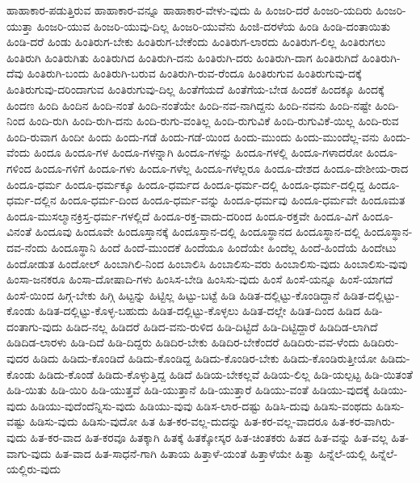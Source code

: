 {ಹಾಹಾಕಾರ-ಪಡುತ್ತಿರುವ
ಹಾಹಾಕಾರ-ವನ್ನೂ
ಹಾಹಾಕಾರ-ವೇಳು-ವುದು
ಹಿ
ಹಿಂಜರಿ-ದರೆ
ಹಿಂಜರಿ-ಯದಿರು
ಹಿಂಜರಿ-ಯುತ್ತಾ
ಹಿಂಜರಿ-ಯುವ
ಹಿಂಜರಿ-ಯುವು-ದಿಲ್ಲ
ಹಿಂಜರಿ-ಯುವೆನು
ಹಿಂಜಿ-ದರಳೆಯ
ಹಿಂಡಿ
ಹಿಂಡಿ-ದಂತಾಯಿತು
ಹಿಂಡಿ-ದರೆ
ಹಿಂಡು
ಹಿಂತಿರುಗ-ಬೇಕು
ಹಿಂತಿರುಗ-ಬೇಕೆಂದು
ಹಿಂತಿರುಗ-ಲಾರದು
ಹಿಂತಿರುಗ-ಲಿಲ್ಲ
ಹಿಂತಿರುಗಲು
ಹಿಂತಿರುಗಿ
ಹಿಂತಿರುಗಿತು
ಹಿಂತಿರುಗಿದ
ಹಿಂತಿರುಗಿ-ದನು
ಹಿಂತಿರುಗಿ-ದರು
ಹಿಂತಿರುಗಿ-ದಾಗ
ಹಿಂತಿರುಗಿದೆ
ಹಿಂತಿರುಗಿ-ದೆವು
ಹಿಂತಿರುಗಿ-ಬಂದು
ಹಿಂತಿರುಗಿ-ಬರುವ
ಹಿಂತಿರುಗಿ-ರುವ-ರೆಂದೂ
ಹಿಂತಿರುಗುವ
ಹಿಂತಿರುಗುವು-ದಕ್ಕೆ
ಹಿಂತಿರುಗುವು-ದರಿಂದಾಗುವ
ಹಿಂತಿರುಗುವು-ದಿಲ್ಲ
ಹಿಂತೆಗೆಯದೆ
ಹಿಂತೆಗೆಯ-ಬೇಡ
ಹಿಂದಕೆ
ಹಿಂದಕ್ಕೂ
ಹಿಂದಕ್ಕೆ
ಹಿಂದಣ
ಹಿಂದಿ
ಹಿಂದಿನ
ಹಿಂದಿ-ನಂತೆ
ಹಿಂದಿ-ನಂತೆಯೇ
ಹಿಂದಿ-ನವ-ನಾಗಿದ್ದನು
ಹಿಂದಿ-ನವನು
ಹಿಂದಿ-ನಷ್ಟೇ
ಹಿಂದಿ-ನಿಂದ
ಹಿಂದಿ-ರುಗಿ
ಹಿಂದಿ-ರುಗಿ-ದನು
ಹಿಂದಿ-ರುಗು-ವಂತಿಲ್ಲ
ಹಿಂದಿ-ರುಗುವಿಕೆ
ಹಿಂದಿ-ರುಗುವಿಕೆ-ಯಿಲ್ಲ
ಹಿಂದಿ-ರುವ
ಹಿಂದಿ-ರುವಾಗ
ಹಿಂದೀ
ಹಿಂದು
ಹಿಂದು-ಗಡೆ
ಹಿಂದು-ಗಡೆ-ಯಿಂದ
ಹಿಂದು-ಮುಂದು
ಹಿಂದು-ಮುಂದೆಲ್ಲ-ವನು
ಹಿಂದು-ವೆಂದು
ಹಿಂದೂ
ಹಿಂದೂ-ಗಳ
ಹಿಂದೂ-ಗಳನ್ನಾಗಿ
ಹಿಂದೂ-ಗಳನ್ನು
ಹಿಂದೂ-ಗಳಲ್ಲಿ
ಹಿಂದೂ-ಗಳಾದರೋ
ಹಿಂದೂ-ಗಳಿಂದ
ಹಿಂದೂ-ಗಳಿಗೆ
ಹಿಂದೂ-ಗಳು
ಹಿಂದೂ-ಗಳೆಲ್ಲ
ಹಿಂದೂ-ಗಳೆಲ್ಲರೂ
ಹಿಂದೂ-ದೇಶದ
ಹಿಂದೂ-ದೇಶೀಯ-ರಾದ
ಹಿಂದೂ-ಧರ್ಮ
ಹಿಂದೂ-ಧರ್ಮಕ್ಕೂ
ಹಿಂದೂ-ಧರ್ಮದ
ಹಿಂದೂ-ಧರ್ಮ-ದಲ್ಲಿ
ಹಿಂದೂ-ಧರ್ಮ-ದಲ್ಲಿದ್ದ
ಹಿಂದೂ-ಧರ್ಮ-ದಲ್ಲಿನ
ಹಿಂದೂ-ಧರ್ಮ-ದಿಂದ
ಹಿಂದೂ-ಧರ್ಮ-ವನ್ನು
ಹಿಂದೂ-ಧರ್ಮವು
ಹಿಂದೂ-ಧರ್ಮವೇ
ಹಿಂದೂಮತ
ಹಿಂದೂ-ಮುಸಲ್ಮಾನಕ್ರಿಸ್ತ-ಧರ್ಮ-ಗಳಲ್ಲಿದೆ
ಹಿಂದೂ-ರಕ್ತ-ವಾದು-ದರಿಂದ
ಹಿಂದೂ-ರಕ್ತವೇ
ಹಿಂದೂ-ವಿಗೆ
ಹಿಂದೂ-ವಿನಂತೆ
ಹಿಂದೂವು
ಹಿಂದೂವೇ
ಹಿಂದೂಸ್ತಾನಕ್ಕೆ
ಹಿಂದೂಸ್ತಾನ-ದಲ್ಲಿ
ಹಿಂದೂಸ್ಥಾನದ
ಹಿಂದೂಸ್ಥಾನ-ದಲ್ಲಿ
ಹಿಂದೂಸ್ಥಾನ-ದವ-ನೆಂದು
ಹಿಂದೂಸ್ಥಾನಿ
ಹಿಂದೆ
ಹಿಂದೆ-ಮುಂದಕೆ
ಹಿಂದೆಯೂ
ಹಿಂದೆಯೇ
ಹಿಂದೆಲ್ಲ
ಹಿಂದೆ-ಹಿಂದೆಯೆ
ಹಿಂದೇಟು
ಹಿಂದೋಡುತ
ಹಿಂದೋಲ್
ಹಿಂಬಾಗಿಲಿ-ನಿಂದ
ಹಿಂಬಾಲಿಸಿ
ಹಿಂಬಾಲಿಸು-ವರು
ಹಿಂಬಾಲಿಸು-ವುದು
ಹಿಂಬಾಲಿಸು-ವುವು
ಹಿಂಸಾ-ಜನಕರೂ
ಹಿಂಸಾ-ದೋಷಾದಿ-ಗಳು
ಹಿಂಸಿಸ-ಬೇಡಿ
ಹಿಂಸಿಸು-ವುದು
ಹಿಂಸೆ
ಹಿಂಸೆ-ಯನ್ನೂ
ಹಿಂಸೆ-ಯಾಗದೆ
ಹಿಂಸೆ-ಯಿಂದ
ಹಿಗ್ಗ-ಬೇಕು
ಹಿಗ್ಗಿ
ಹಿಟ್ಟನ್ನು
ಹಿಟ್ಟಿಲ್ಲ
ಹಿಟ್ಟು-ಬಟ್ಟೆ
ಹಿಡಿ
ಹಿಡಿತ-ದಲ್ಲಿಟ್ಟು-ಕೊಂಡಿದ್ದಾನೆ
ಹಿಡಿತ-ದಲ್ಲಿಟ್ಟು-ಕೊಂಡು
ಹಿಡಿತ-ದಲ್ಲಿಟ್ಟು-ಕೊಳ್ಳ-ಬಹುದು
ಹಿಡಿತ-ದಲ್ಲಿಟ್ಟು-ಕೊಳ್ಳಲು
ಹಿಡಿತ-ದಲ್ಲೇ
ಹಿಡಿತ-ದಿಂದ
ಹಿಡಿದ
ಹಿಡಿ-ದಂತಾಗು-ವುದು
ಹಿಡಿದ-ನಲ್ಲ
ಹಿಡಿದರೆ
ಹಿಡಿದ-ವನು-ರುಳಿದ
ಹಿಡಿ-ದಿಟ್ಟಿದೆ
ಹಿಡಿ-ದಿಟ್ಟಿದ್ದಾರೆ
ಹಿಡಿದಿಡ-ಲಾಗಿದೆ
ಹಿಡಿದಿಡ-ಲಾರಳು
ಹಿಡಿ-ದಿದೆ
ಹಿಡಿ-ದಿದ್ದರು
ಹಿಡಿದಿರ-ಬೇಕು
ಹಿಡಿದಿರ-ಬೇಕೆಂದರೆ
ಹಿಡಿದಿರು-ವವ-ಳೆಂದು
ಹಿಡಿದಿರು-ವುದರ
ಹಿಡಿದು
ಹಿಡಿದು-ಕೊಂಡಿದೆ
ಹಿಡಿದು-ಕೊಂಡಿದ್ದ
ಹಿಡಿದು-ಕೊಂಡಿರ-ಬೇಕು
ಹಿಡಿದು-ಕೊಂಡಿರುತ್ತೀಯೋ
ಹಿಡಿದು-ಕೊಂಡು
ಹಿಡಿದು-ಕೊಂಡೆ
ಹಿಡಿದು-ಕೊಳ್ಳುತ್ತಿದ್ದ
ಹಿಡಿದೆ
ಹಿಡಿಯ-ಬೇಕಲ್ಲವೆ
ಹಿಡಿಯ-ಲಿಲ್ಲ
ಹಿಡಿ-ಯಲ್ಪಟ್ಟ
ಹಿಡಿ-ಯಿತಂತೆ
ಹಿಡಿ-ಯಿತು
ಹಿಡಿ-ಯಿರಿ
ಹಿಡಿ-ಯುತ್ತವೆ
ಹಿಡಿ-ಯುತ್ತಾನೆ
ಹಿಡಿ-ಯುತ್ತಾರೆ
ಹಿಡಿಯು-ವಂತೆ
ಹಿಡಿಯು-ವುದಕ್ಕೆ
ಹಿಡಿಯು-ವುದು
ಹಿಡಿಯು-ವುದೆಂದೆನ್ನಿಸು-ವುದು
ಹಿಡಿಯು-ವುವು
ಹಿಡಿಸ-ಲಾರ-ದಷ್ಟು
ಹಿಡಿಸಿ-ದುವು
ಹಿಡಿಸು-ವಂಥದು
ಹಿಡಿಸು-ವಷ್ಟು
ಹಿಡಿಸು-ವುದು
ಹಿಡಿಸು-ವುದೋ
ಹಿತ
ಹಿತ-ಕರ-ವಲ್ಲ-ದುದನ್ನು
ಹಿತ-ಕರ-ವಲ್ಲ-ವಾದರೂ
ಹಿತ-ಕರ-ವಾಗಿರು-ವುದು
ಹಿತ-ಕರ-ವಾದ
ಹಿತ-ಕರವೂ
ಹಿತಕ್ಕಾಗಿ
ಹಿತಕ್ಕೆ
ಹಿತಕ್ಕೋಸ್ಕರ
ಹಿತ-ಚಿಂತಕರು
ಹಿತದ
ಹಿತ-ವನ್ನು
ಹಿತ-ವಲ್ಲ
ಹಿತ-ವಾಗು-ವುದು
ಹಿತ-ವಾದ
ಹಿತ-ಸಾಧನೆ-ಗಾಗಿ
ಹಿತಾಯ
ಹಿತ್ತಾಳೆ-ಯಂತೆ
ಹಿತ್ತಾಳೆಯೇ
ಹಿತ್ವಾ
ಹಿನ್ನೆಲೆ-ಯಲ್ಲಿ
ಹಿನ್ನೆಲೆ-ಯಲ್ಲಿರು-ವುದು
}
